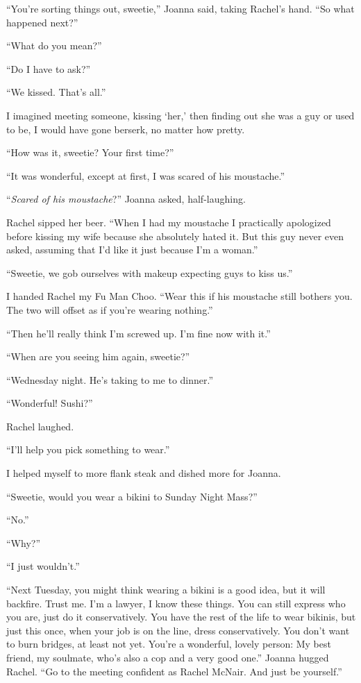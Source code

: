 ``You're sorting things out, sweetie,'' Joanna said, taking Rachel's
hand. ``So what happened next?''

``What do you mean?''

``Do I have to ask?''

``We kissed. That's all.''

I imagined meeting someone, kissing `her,' then finding out she was a
guy or used to be, I would have gone berserk, no matter how pretty.

``How was it, sweetie? Your first time?''

``It was wonderful, except at first, I was scared of his moustache.''

``\emph{Scared of his moustache}?'' Joanna asked, half-laughing.

Rachel sipped her beer. ``When I had my moustache I practically
apologized before kissing my wife because she absolutely hated it. But
this guy never even asked, assuming that I'd like it just because I'm a
woman.''

``Sweetie, we gob ourselves with makeup expecting guys to kiss us.''

I handed Rachel my Fu Man Choo. ``Wear this if his moustache still
bothers you. The two will offset as if you're wearing nothing.''

``Then he'll really think I'm screwed up. I'm fine now with it.''

``When are you seeing him again, sweetie?''

``Wednesday night. He's taking to me to dinner.''

``Wonderful! Sushi?''

Rachel laughed.

``I'll help you pick something to wear.''

I helped myself to more flank steak and dished more for Joanna.

``Sweetie, would you wear a bikini to Sunday Night Mass?''

``No.''

``Why?''

``I just wouldn't.''

``Next Tuesday, you might think wearing a bikini is a good idea, but it
will backfire. Trust me. I'm a lawyer, I know these things. You can
still express who you are, just do it conservatively. You have the rest
of the life to wear bikinis, but just this once, when your job is on the
line, dress conservatively. You don't want to burn bridges, at least not
yet. You're a wonderful, lovely person: My best friend, my soulmate,
who's also a cop and a very good one.'' Joanna hugged Rachel. ``Go to
the meeting confident as Rachel McNair. And just be yourself.''

